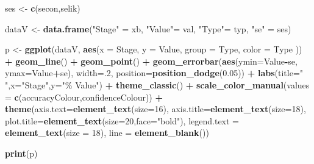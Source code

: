 \documentclass[a4paper, nobind]{templates/ociamthesis}
\newenvironment{Shaded}{\begin{snugshade}}{\end{snugshade}}
\newcommand{\AttributeTok}[1]{\textcolor[rgb]{0.13,0.29,0.53}{#1}}
\newcommand{\DecValTok}[1]{\textcolor[rgb]{0.00,0.00,0.81}{#1}}
\newcommand{\FloatTok}[1]{\textcolor[rgb]{0.00,0.00,0.81}{#1}}
\newcommand{\FunctionTok}[1]{\textcolor[rgb]{0.13,0.29,0.53}{\textbf{#1}}}
\newcommand{\NormalTok}[1]{#1}
\newcommand{\OtherTok}[1]{\textcolor[rgb]{0.56,0.35,0.01}{#1}}
\newcommand{\SpecialCharTok}[1]{\textcolor[rgb]{0.81,0.36,0.00}{\textbf{#1}}}
\newcommand{\StringTok}[1]{\textcolor[rgb]{0.31,0.60,0.02}{#1}}
\renewenvironment{Shaded}
{
  \vspace{10pt}%
  \begin{snugshade}%
}{%
  \end{snugshade}%
  \vspace{8pt}%
}
\begin{document}
\begin{Shaded}
\begin{Highlighting}[]
\NormalTok{ses }\OtherTok{\textless{}{-}} \FunctionTok{c}\NormalTok{(secon,selik)}

\NormalTok{dataV }\OtherTok{\textless{}{-}} \FunctionTok{data.frame}\NormalTok{(}\StringTok{"Stage"} \OtherTok{=}\NormalTok{ xb, }\StringTok{"Value"}\OtherTok{=}\NormalTok{ val, }\StringTok{"Type"}\OtherTok{=}\NormalTok{ typ, }\StringTok{"se"} \OtherTok{=}\NormalTok{ ses)}

\NormalTok{p }\OtherTok{\textless{}{-}} \FunctionTok{ggplot}\NormalTok{(dataV, }\FunctionTok{aes}\NormalTok{(}\AttributeTok{x =}\NormalTok{ Stage, }\AttributeTok{y =}\NormalTok{ Value, }\AttributeTok{group =}\NormalTok{ Type, }\AttributeTok{color =}\NormalTok{ Type )) }\SpecialCharTok{+}
  \FunctionTok{geom\_line}\NormalTok{() }\SpecialCharTok{+}
  \FunctionTok{geom\_point}\NormalTok{() }\SpecialCharTok{+}
  \FunctionTok{geom\_errorbar}\NormalTok{(}\FunctionTok{aes}\NormalTok{(}\AttributeTok{ymin=}\NormalTok{Value}\SpecialCharTok{{-}}\NormalTok{se, }\AttributeTok{ymax=}\NormalTok{Value}\SpecialCharTok{+}\NormalTok{se), }\AttributeTok{width=}\NormalTok{.}\DecValTok{2}\NormalTok{, }\AttributeTok{position=}\FunctionTok{position\_dodge}\NormalTok{(}\FloatTok{0.05}\NormalTok{)) }\SpecialCharTok{+}
  \FunctionTok{labs}\NormalTok{(}\AttributeTok{title=}\StringTok{"   "}\NormalTok{,}\AttributeTok{x=}\StringTok{"Stage"}\NormalTok{,}\AttributeTok{y=}\StringTok{"\% Value"}\NormalTok{) }\SpecialCharTok{+}
  \FunctionTok{theme\_classic}\NormalTok{() }\SpecialCharTok{+}
  \FunctionTok{scale\_color\_manual}\NormalTok{(}\AttributeTok{values =} \FunctionTok{c}\NormalTok{(accuracyColour,confidenceColour)) }\SpecialCharTok{+}
  \FunctionTok{theme}\NormalTok{(}\AttributeTok{axis.text=}\FunctionTok{element\_text}\NormalTok{(}\AttributeTok{size=}\DecValTok{16}\NormalTok{),}
                             \AttributeTok{axis.title=}\FunctionTok{element\_text}\NormalTok{(}\AttributeTok{size=}\DecValTok{18}\NormalTok{),}
                             \AttributeTok{plot.title=}\FunctionTok{element\_text}\NormalTok{(}\AttributeTok{size=}\DecValTok{20}\NormalTok{,}\AttributeTok{face=}\StringTok{"bold"}\NormalTok{),}
                             \AttributeTok{legend.text =} \FunctionTok{element\_text}\NormalTok{(}\AttributeTok{size =} \DecValTok{18}\NormalTok{),}
                             \AttributeTok{line =} \FunctionTok{element\_blank}\NormalTok{())}

\FunctionTok{print}\NormalTok{(p)}
\end{Highlighting}
\end{Shaded}
\end{document}
